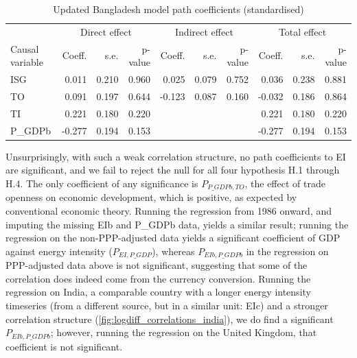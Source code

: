 \documentclass[11pt,a4paper]{article}
\begin{document}
\begin{table}[tbp]
\centering
\begin{adjustbox}{max width=\textwidth}
\begin{tabular}{l|rrr|rrr|rrr}
\toprule
 				& \multicolumn{3}{c|}{Direct effect}  & \multicolumn{3}{c|}{Indirect effect} & \multicolumn{3}{c}{Total effect} \\
Causal variable & Coeff. & s.e. & p-value & Coeff. & s.e. & p-value & Coeff. & s.e. & p-value \\
\midrule
            ISG &     0.011 &   0.210 &      0.960 &     0.025 &   0.079 &      0.752 &     0.036 &   0.238 &      0.881 \\
             TO &     0.091 &   0.197 &      0.644 &    -0.123 &   0.087 &      0.160 &    -0.032 &   0.186 &      0.864 \\
             TI &     0.221 &   0.180 &      0.220 &           &         &            &     0.221 &   0.180 &      0.220 \\
        P\_GDPb &    -0.277 &   0.194 &      0.153 &           &         &            &    -0.277 &   0.194 &      0.153 \\
\bottomrule
\end{tabular}
\end{adjustbox}
\caption{Updated Bangladesh model path coefficients (standardised)}
\label{tab:updated_path_coeff}
\end{table}

Unsurprisingly, with such a weak correlation structure, no path coefficients to EI are significant, and we fail to reject the null for all four hypothesis H.1 through H.4.
The only coefficient of any significance is $P_{P\_GDPb,TO}$, the effect of trade openness on economic development, which is positive, as expected by conventional economic theory. 
Running the regression from 1986 onward, and imputing the missing EIb and P\_GDPb data, yields a similar result; running the regression on the non-PPP-adjusted data yields a significant coefficient of GDP against energy intensity ($P_{EI,P\_GDP}$), whereas $P_{EIb,P\_GDPb}$ in the regression on PPP-adjusted data above is not significant, suggesting that some of the correlation does indeed come from the currency conversion. 
Running the regression on India, a comparable country with a longer energy intensity timeseries (from a different source, but in a similar unit: EIc) and a stronger correlation structure (\cref{fig:logdiff_correlations_india}), we do find a significant $P_{EIb,P\_GDPb}$; however, running the regression on the United Kingdom, that coefficient is not significant. 
\end{document}
